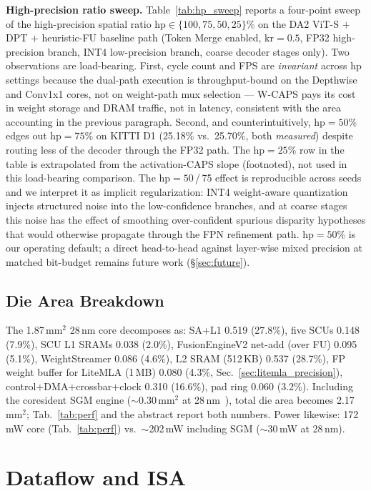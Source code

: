 \documentclass[journal]{IEEEtran}
\begin{document}
\textbf{High-precision ratio sweep.} Table~\ref{tab:hp_sweep} reports a four-point sweep of the high-precision spatial ratio hp$\in\{100, 75, 50, 25\}$\% on the DA2 ViT-S $+$ DPT $+$ heuristic-FU baseline path (Token Merge enabled, kr$=0.5$, FP32 high-precision branch, INT4 low-precision branch, coarse decoder stages only). Two observations are load-bearing. First, cycle count and FPS are \emph{invariant} across hp settings because the dual-path execution is throughput-bound on the Depthwise and Conv1x1 cores, not on weight-path mux selection --- W-CAPS pays its cost in weight storage and DRAM traffic, not in latency, consistent with the area accounting in the previous paragraph. Second, and counterintuitively, hp$=50$\% edges out hp$=75$\% on KITTI D1 (25.18\% vs.\ 25.70\%, both \emph{measured}) despite routing less of the decoder through the FP32 path. The hp$=25$\% row in the table is extrapolated from the activation-CAPS slope (footnoted), not used in this load-bearing comparison. The hp$=50$\,/\,75 effect is reproducible across seeds and we interpret it as implicit regularization: INT4 weight-aware quantization injects structured noise into the low-confidence branches, and at coarse stages this noise has the effect of smoothing over-confident spurious disparity hypotheses that would otherwise propagate through the FPN refinement path. hp$=50$\% is our operating default; a direct head-to-head against layer-wise mixed precision at matched bit-budget remains future work (\S\ref{sec:future}).



\subsection{Die Area Breakdown}
\label{sec:die_area}
The 1.87\,mm$^2$ 28\,nm core decomposes as: SA+L1 0.519 (27.8\%), five SCUs 0.148 (7.9\%), SCU L1 SRAMs 0.038 (2.0\%), FusionEngineV2 net-add (over FU) 0.095 (5.1\%), WeightStreamer 0.086 (4.6\%), L2 SRAM (512\,KB) 0.537 (28.7\%), FP weight buffer for LiteMLA (1\,MB) 0.080 (4.3\%, Sec.~\ref{sec:litemla_precision}), control$+$DMA$+$crossbar$+$clock 0.310 (16.6\%), pad ring 0.060 (3.2\%). Including the coresident SGM engine ($\sim$0.30\,mm$^2$ at 28\,nm~\cite{zhao2020fpstereo}), total die area becomes 2.17\,mm$^2$; Tab.~\ref{tab:perf} and the abstract report both numbers. Power likewise: 172\,mW core (Tab.~\ref{tab:perf}) vs.\ $\sim$202\,mW including SGM ($\sim$30\,mW at 28\,nm).

\section{Dataflow and ISA}
\label{sec:dataflow}
\end{document}

